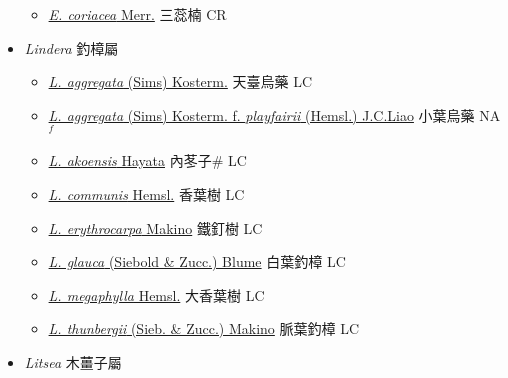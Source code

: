\begin{itemize}
  \begin{itemize}
        \item[] \href{http://www.theplantlist.org/tpl1.1/search?q=Endiandra+coriacea}{\textit{E. coriacea} Merr.}   三蕊楠 CR
  \end{itemize}
 \item[] \textit{Lindera} 釣樟屬
                    
  \begin{itemize}
        \item[] \href{http://www.theplantlist.org/tpl1.1/search?q=Lindera+aggregata}{\textit{L. aggregata} (Sims) Kosterm.}   天臺烏藥 LC
        \item[] \href{http://www.theplantlist.org/tpl1.1/search?q=Lindera+aggregata+ f. +playfairii}{\textit{L. aggregata} (Sims) Kosterm.  f.  \textit{playfairii} (Hemsl.) J.C.Liao}   小葉烏藥 NA $^f$
        \item[] \href{http://www.theplantlist.org/tpl1.1/search?q=Lindera+akoensis}{\textit{L. akoensis} Hayata}   內苳子\# LC
        \item[] \href{http://www.theplantlist.org/tpl1.1/search?q=Lindera+communis}{\textit{L. communis} Hemsl.}   香葉樹 LC
        \item[] \href{http://www.theplantlist.org/tpl1.1/search?q=Lindera+erythrocarpa}{\textit{L. erythrocarpa} Makino}   鐵釘樹 LC
        \item[] \href{http://www.theplantlist.org/tpl1.1/search?q=Lindera+glauca}{\textit{L. glauca} (Siebold \& Zucc.) Blume}   白葉釣樟 LC
        \item[] \href{http://www.theplantlist.org/tpl1.1/search?q=Lindera+megaphylla}{\textit{L. megaphylla} Hemsl.}   大香葉樹 LC
        \item[] \href{http://www.theplantlist.org/tpl1.1/search?q=Lindera+thunbergii}{\textit{L. thunbergii} (Sieb. \& Zucc.) Makino}   脈葉釣樟 LC
  \end{itemize}
 \item[] \textit{Litsea} 木薑子屬
                    

\end{itemize}
